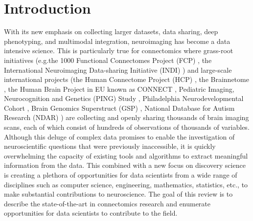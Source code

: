 \documentclass{bmcart}
\begin{document}
\begin{frontmatter}
\begin{abstractbox}
\begin{keyword}
\end{keyword}


\end{abstractbox}
%

\end{frontmatter}

\section{Introduction}

With its new emphasis on collecting larger datasets, data sharing, deep phenotyping, and multimodal integration, neuroimaging has become a data intensive science. This is particularly true for connectomics where grass-root initiatives (e.g.the 1000 Functional Connectomes Project (FCP) \cite{Biswal2010}, the International Neuroimaging Data-sharing Initiative (INDI) \cite{Mennes2013}) and large-scale international projects (the Human Connectome Project (HCP) \cite{RosenHCP2010,VanEssen2012}, the Brainnetome \cite{Jiang2013}, the Human Brain Project in EU known as CONNECT \cite{Assaf2013}, Pediatric Imaging, Neurocognition and Genetics (PING) Study \cite{JerniganPING}, Philadelphia Neurodevelopmental Cohort \cite{Satterthwaite2014},  Brain Genomics Superstruct (GSP) \cite{BucknerGSP2014}, National Database for Autism Research (NDAR) \cite{NDAR}) are collecting and openly sharing thousands of brain imaging scans, each of which consist of hundreds of observations of thousands of variables. Although this deluge of complex data promises to enable the investigation of neuroscientific questions that were previously inaccessible, it is quickly overwhelming the capacity of existing tools and algorithms to extract meaningful information from the data. This combined with a new focus on discovery science is creating a plethora of opportunities for data scientists from a wide range of disciplines such as computer science, engineering, mathematics, statistics, etc., to make substantial contributions to neuroscience. The goal of this review is to describe the state-of-the-art in connectomics research and enumerate opportunities for data scientists to contribute to the field.
\end{document}
